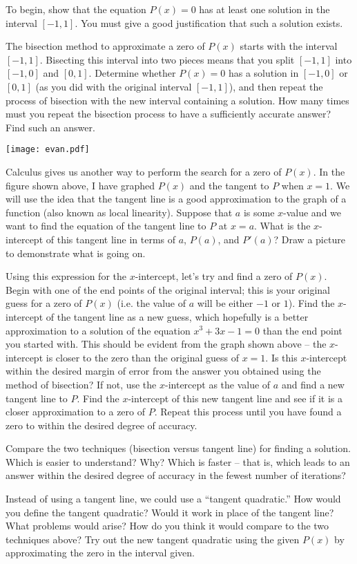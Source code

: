 \documentclass
[justified,nohyper]
{tufte-handout}
\theoremstyle{mydef}
\begin{document}
To begin, show that the equation $P(x)=0$ has at least one solution in the interval $[-1,1]$. You must give a good justification that such a solution exists.

The bisection method to approximate a zero of $P(x)$ starts with the interval $[-1,1]$. Bisecting this interval into two pieces means that you split $[-1,1]$ into $[-1,0]$ and $[0,1]$. Determine whether $P(x)=0$ has a solution in $[-1,0]$ or $[0,1]$ (as you did with the original interval $[-1,1]$), and then repeat the process of bisection with the new interval containing a solution. How many times must you repeat the bisection process to have a sufficiently accurate answer? Find such an answer.

\newpage

\texttt{[image: evan.pdf]}

Calculus gives us another way to perform the search for a zero of $P(x)$. In the figure shown above, I have graphed $P(x)$ and the tangent to $P$ when $x=1$. We will use the idea that the tangent line is a good approximation to the graph of a function (also known as local linearity). Suppose that $a$ is some $x$-value and we want to find the equation of the tangent line to $P$ at $x=a$. What is the $x$-intercept of this tangent line in terms of $a$, $P(a)$, and $P'(a)$? Draw a picture to demonstrate what is going on.

Using this expression for the $x$-intercept, let's try and find a zero of $P(x)$. Begin with one of the end points of the original interval; this is your original guess for a zero of $P(x)$ (i.e. the value of $a$ will be either $-1$ or $1$). Find the $x$-intercept of the tangent line as a new guess, which hopefully is a better approximation to a solution of the equation $x^3+3x-1=0$ than the end point you started with. This should be evident from the graph shown above -- the $x$-intercept is closer to the zero than the original guess of $x=1$. Is this $x$-intercept within the desired margin of error from the answer you obtained using the method of bisection? If not, use the $x$-intercept as the value of $a$ and find a new tangent line to $P$. Find the $x$-intercept of this new tangent line and see if it is a closer approximation to a zero of $P$. Repeat this process until you have found a zero to within the desired degree of accuracy.

Compare the two techniques (bisection versus tangent line) for finding a solution. Which is easier to understand? Why? Which is faster -- that is, which leads to an answer within the desired degree of accuracy in the fewest number of iterations?

Instead of using a tangent line, we could use a ``tangent quadratic.'' How would you define the tangent quadratic? Would it work in place of the tangent line? What problems would arise? How do you think it would compare to the two techniques above? Try out the new tangent quadratic using the given $P(x)$ by approximating the zero in the interval given.
\end{document}

